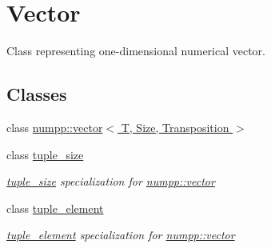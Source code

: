 \hypertarget{group__numpp__structures__vector}{}\section{Vector}
\label{group__numpp__structures__vector}


Class representing one-\/dimensional numerical vector.  


\subsection*{Classes}
\begin{DoxyCompactItemize}
\item 
class \hyperlink{classnumpp_1_1vector}{numpp\+::vector$<$ T, Size, Transposition $>$}
\item 
class \hyperlink{classtuple__size}{tuple\+\_\+size}
\begin{DoxyCompactList}\small\item\em \hyperlink{classtuple__size}{tuple\+\_\+size} specialization for \hyperlink{classnumpp_1_1vector}{numpp\+::vector} \end{DoxyCompactList}\item 
class \hyperlink{classtuple__element}{tuple\+\_\+element}
\begin{DoxyCompactList}\small\item\em \hyperlink{classtuple__element}{tuple\+\_\+element} specialization for \hyperlink{classnumpp_1_1vector}{numpp\+::vector} \end{DoxyCompactList}\end{DoxyCompactItemize}
